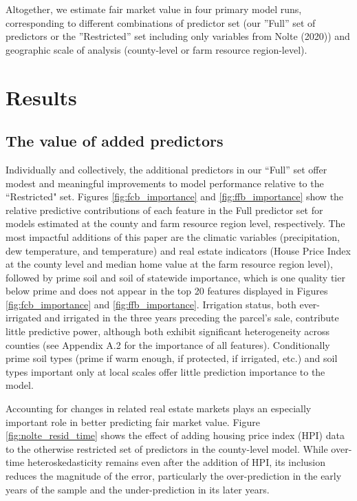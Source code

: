 \documentclass[12pt]{article}
\begin{document}
Altogether, we estimate fair market value in four primary model runs, corresponding to different combinations of predictor set (our ''Full'' set of predictors or the ''Restricted'' set including only variables from Nolte (2020)) and geographic scale of analysis (county-level or farm resource region-level). 

\newpage

\section{Results}

\subsection{The value of added predictors}

Individually and collectively, the additional predictors in our ``Full'' set offer modest and meaningful improvements to model performance relative to the ``Restricted" set. Figures \ref{fig:fcb_importance} and \ref{fig:ffb_importance} show the relative predictive contributions of each feature in the Full predictor set for models estimated at the county and farm resource region level, respectively. The most impactful additions of this paper are the climatic variables (precipitation, dew temperature, and temperature) and real estate indicators (House Price Index at the county level and median home value at the farm resource region level), followed by prime soil and soil of statewide importance, which is one quality tier below prime and does not appear in the top 20 features displayed in Figures \ref{fig:fcb_importance} and \ref{fig:ffb_importance}. Irrigation status, both ever-irrigated and irrigated in the three years preceding the parcel's sale, contribute little predictive power, although both exhibit significant heterogeneity across counties (see Appendix A.2 for the importance of all features). Conditionally prime soil types (prime if warm enough, if protected, if irrigated, etc.) and soil types important only at local scales offer little prediction importance to the model.

Accounting for changes in related real estate markets plays an especially important role in better predicting fair market value. Figure \ref{fig:nolte_resid_time} shows the effect of adding housing price index (HPI) data to the otherwise restricted set of predictors in the county-level model. While over-time heteroskedasticity remains even after the addition of HPI, its inclusion reduces the magnitude of the error, particularly the over-prediction in the early years of the sample and the under-prediction in its later years.
\end{document}
